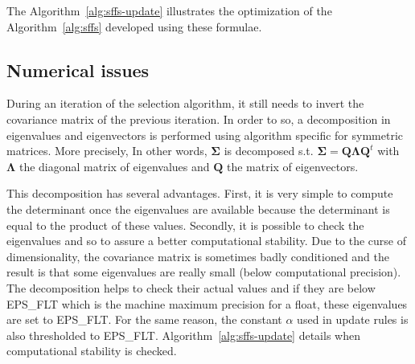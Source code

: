 \documentclass[journal,peerreview,onecolumn]{IEEEtran}
\begin{document}
        The Algorithm~\ref{alg:sffs-update} illustrates the optimization of the Algorithm~\ref{alg:sffs} developed using these formulae.

    \subsection{Numerical issues}

    During an iteration of the selection algorithm, it still needs to invert the covariance matrix of the previous iteration. In order to so, a decomposition in eigenvalues and eigenvectors is performed using algorithm specific for symmetric matrices. More precisely, In other words, $\boldsymbol{\Sigma}$ is decomposed s.t. $\boldsymbol{\Sigma} = \mathbf{Q} \boldsymbol{\Lambda} \mathbf{Q}^t$ with $\boldsymbol{\Lambda}$ the diagonal matrix of eigenvalues and $\mathbf{Q}$ the matrix of eigenvectors.

    This decomposition has several advantages. First, it is very simple to compute the determinant once the eigenvalues are available because the determinant is equal to the product of these values. Secondly, it is possible to check the eigenvalues and so to assure a better computational stability. Due to the curse of dimensionality, the covariance matrix is sometimes badly conditioned and the result is that some eigenvalues are really small (below computational precision). The decomposition helps to check their actual values and if they are below EPS\_FLT which is the machine maximum precision for a float, these eigenvalues are set to EPS\_FLT. For the same reason, the constant $\alpha$ used in update rules is also thresholded to EPS\_FLT. Algorithm~\ref{alg:sffs-update} details when computational stability is checked.
\end{document}
